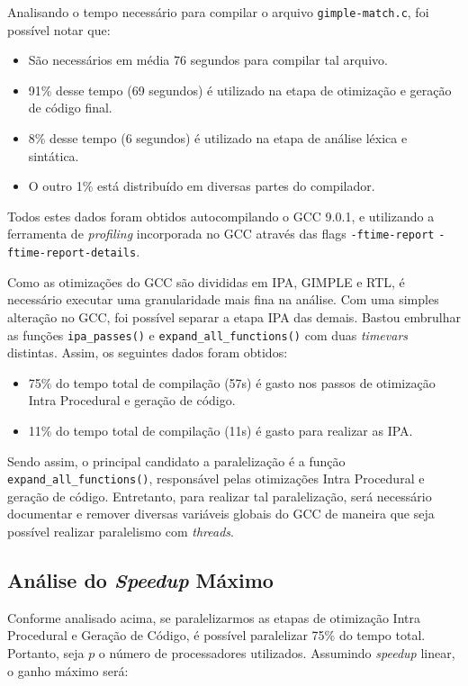 Analisando o tempo necessário para compilar o arquivo \texttt{gimple-match.c},
foi possível notar que:
\begin{itemize}
    \item São necessários em média 76 segundos para compilar tal arquivo.

    \item 91\% desse tempo (69 segundos) é utilizado na etapa de otimização
        e geração de código final.

    \item 8\% desse tempo (6 segundos) é utilizado na etapa de análise léxica
        e sintática.

    \item O outro 1\% está distribuído em diversas partes do compilador.
\end{itemize}
Todos estes dados foram obtidos autocompilando o GCC 9.0.1, e utilizando a
ferramenta de \textit{profiling} incorporada
no GCC através das flags \texttt{-ftime-report} \texttt{-ftime-report-details}.

Como as otimizações do GCC são divididas em IPA, GIMPLE e RTL, é necessário
executar uma granularidade mais fina na análise. Com uma simples alteração
no GCC, foi possível separar a etapa IPA das demais. Bastou embrulhar as funções
\texttt{ipa\_passes()} e \texttt{expand\_all\_functions()} com duas \textit{timevars}
distintas. Assim, os seguintes dados foram obtidos:
\begin{itemize}
    \item 75\% do tempo total de compilação (57s) é gasto nos passos de otimização
        Intra Procedural e geração de código.

    \item 11\% do tempo total de compilação (11s) é gasto para realizar as IPA.
\end{itemize}
Sendo assim, o principal candidato a paralelização é a função \texttt{expand\_all\_functions()},
responsável pelas otimizações Intra Procedural e geração de código.
Entretanto, para realizar tal paralelização, será necessário documentar e remover diversas
variáveis globais do GCC de maneira que seja possível realizar paralelismo com \textit{threads}.

\subsection{Análise do \textit{Speedup} Máximo}

Conforme analisado acima, se paralelizarmos as etapas de otimização Intra
Procedural e Geração de Código, é possível paralelizar 75\% do tempo total.
Portanto, seja $p$ o número de processadores utilizados. Assumindo
\textit{speedup} linear, o ganho máximo será:

